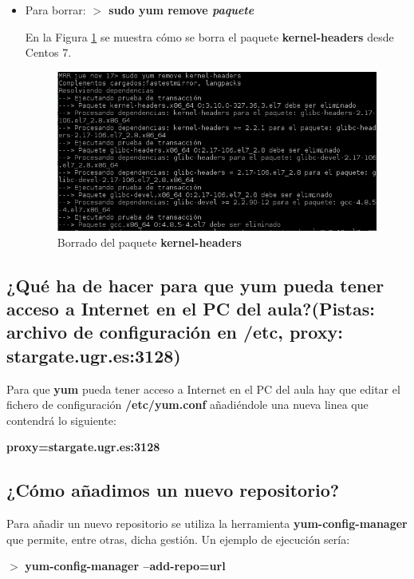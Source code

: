 \begin{itemize}
\newpage
	
	\item Para borrar: \textbf{$ > $ sudo yum remove \textit{paquete}}
	
	En la Figura \ref{fig:figura2} se muestra cómo se borra el paquete \textbf{kernel-headers} desde Centos 7.
	\begin{figure}[H] %
		\centering
		\includegraphics[scale=0.7]{figuras/figura2.png} 
		\caption{Borrado del paquete \textbf{kernel-headers}} 
		\label{fig:figura2}
	\end{figure}			
\end{itemize}
\subsection{¿Qué ha de hacer para que yum pueda tener
	acceso a Internet en el PC del aula?(Pistas: archivo de configuración en /etc,	proxy: stargate.ugr.es:3128)}

Para que \textbf{yum} pueda tener acceso a Internet en el PC del aula hay que editar el fichero de configuración \textbf{/etc/yum.conf}\cite{enlace3} añadiéndole una nueva linea que contendrá lo siguiente: 

\begin{center}
	\textbf{proxy=stargate.ugr.es:3128}
\end{center}

\subsection{¿Cómo añadimos un nuevo repositorio?}

Para añadir un nuevo repositorio se utiliza la herramienta \textbf{yum-config-manager}\cite{enlace4} que permite, entre otras, dicha gestión. Un ejemplo de ejecución sería:

\begin{center}
	$ > $ \textbf{yum-config-manager –add-repo=url}
\end{center}

